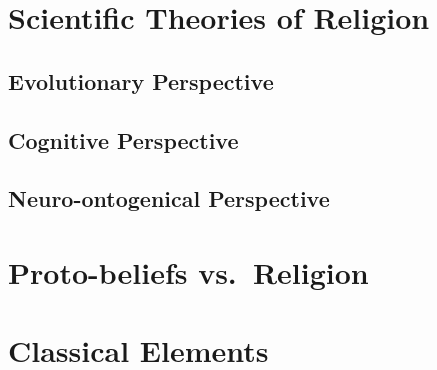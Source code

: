 \documentclass[
]{book}
\begin{document}
\hypertarget{scientific-theories-of-religion}{%
\section{Scientific Theories of Religion}\label{scientific-theories-of-religion}}

\hypertarget{evolutionary-perspective}{%
\subsection{Evolutionary Perspective}\label{evolutionary-perspective}}

\hypertarget{cognitive-perspective}{%
\subsection{Cognitive Perspective}\label{cognitive-perspective}}

\hypertarget{neuro-ontogenical-perspective}{%
\subsection{Neuro-ontogenical Perspective}\label{neuro-ontogenical-perspective}}

\hypertarget{proto-beliefs-vs.-religion}{%
\section{Proto-beliefs vs.~Religion}\label{proto-beliefs-vs.-religion}}

\hypertarget{classical-elements}{%
\section{Classical Elements}\label{classical-elements}}

  
\end{document}
